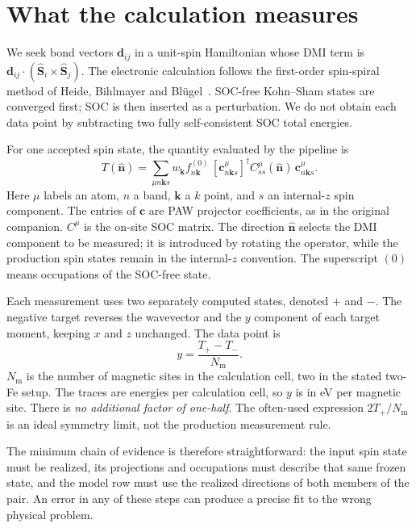 \documentclass[11pt,a4paper]{article}
\numberwithin{equation}{section}
\newcommand{\vct}[1]{\bm{#1}}
\newcommand{\nh}{\hat{\vct n}}
\newcommand{\kh}{\vct k}
\newcommand{\Nm}{N_{\mathrm m}}
\begin{document}
\section{What the calculation measures}\label{sec:overview}

We seek bond vectors $\vct d_{ij}$ in a unit-spin Hamiltonian whose DMI term is
$\vct d_{ij}\cdot(\hat{\vct S}_i\times\hat{\vct S}_j)$.
The electronic calculation follows the first-order spin-spiral method of
Heide, Bihlmayer and Bl\"ugel~\cite{heide}. SOC-free Kohn--Sham states are
converged first; SOC is then inserted as a perturbation. We do not obtain
each data point by subtracting two fully self-consistent SOC total energies.

For one accepted spin state, the quantity evaluated by the pipeline is
\begin{equation}\label{eq:trace}
 \boxed{T(\nh)=
 \sum_{\mu n\kh s}w_{\kh}f^{(0)}_{n\kh}
 \,[\vct c^\mu_{n\kh s}]^\dagger C^\mu_{ss}(\nh)
 \,\vct c^\mu_{n\kh s}.}
\end{equation}
Here $\mu$ labels an atom, $n$ a band, $\kh$ a $k$ point, and $s$ an
internal-$z$ spin component. The entries of $\vct c$ are PAW projector
coefficients, as in the original companion. $C^\mu$ is the on-site SOC matrix.
The direction $\nh$ selects the DMI component to be measured; it is introduced
by rotating the operator, while the production spin states remain in the
internal-$z$ convention. The superscript $(0)$ means occupations of the
SOC-free state.

Each measurement uses two separately computed states, denoted $+$ and $-$.
The negative target reverses the wavevector and the $y$ component of
each target moment, keeping $x$ and $z$ unchanged. The data point is
\begin{equation}\label{eq:y}
 \boxed{y=\frac{T_+-T_-}{\Nm}.}
\end{equation}
$\Nm$ is the number of magnetic sites in the calculation cell, two in the
stated two-Fe setup. The traces are energies per calculation cell, so $y$ is
in eV per magnetic site. There is \emph{no additional factor of one-half}.
The often-used expression $2T_+/\Nm$ is an ideal symmetry limit, not the
production measurement rule.

The minimum chain of evidence is therefore straightforward: the input spin
state must be realized, its projections and occupations must describe that
same frozen state, and the model row must use the realized directions of both
members of the pair. An error in any of these steps can produce a precise
fit to the wrong physical problem.
\end{document}
